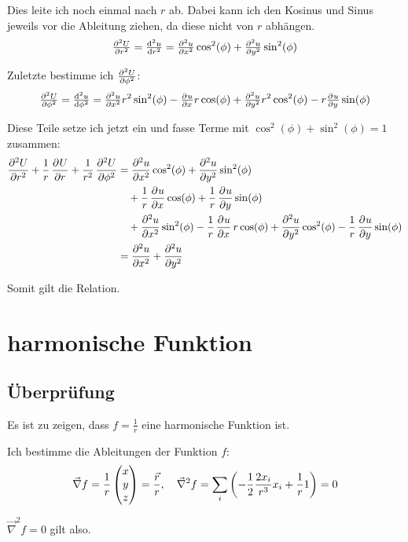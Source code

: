 \documentclass[11pt, ngerman]{article}
\newcommand{\laplace}{\vnabla^2}
\newcommand{\vnabla}{\vec \nabla}
\begin{document}
Dies leite ich noch einmal nach $r$ ab. Dabei kann ich den Kosinus und Sinus
jeweils vor die Ableitung ziehen, da diese nicht von $r$ abhängen.
\[
	\pd[2] Ur = \od[2] ur = \pd[2] ux \cos^2(\phi) + \pd[2] uy \sin^2(\phi)
\]

Zuletzte bestimme ich $\pd[2] U\phi$:
\[
	\pd[2] U\phi = \od[2] u\phi = \pd[2] ux r^2 \sin^2(\phi) - \pd ux r
	\cos(\phi) + \pd[2] uy r^2 \cos^2(\phi) - r \pd uy \sin(\phi)
\]

Diese Teile setze ich jetzt ein und fasse Terme mit $\cos^2(\phi) +
\sin^2(\phi) = 1$ zusammen:
%
\begin{align*}
	\dpd[2] Ur + \frac 1r \dpd Ur + \frac 1{r^2} \dpd[2] U\phi
	&=\dpd[2] ux \cos^2(\phi) + \dpd[2] uy \sin^2(\phi) \\
	&\quad+ \frac 1r \dpd ux \cos(\phi) + \frac 1r \dpd uy \sin(\phi) \\
	&\quad+ \dpd[2] ux \sin^2(\phi) - \frac 1r \dpd ux r \cos(\phi) + \dpd[2]
	uy \cos^2(\phi) - \frac 1r \dpd uy \sin(\phi) \\
	&= \dpd[2] ux + \dpd[2] uy
\end{align*}

Somit gilt die Relation.

\section{harmonische Funktion}

\subsection{Überprüfung}

Es ist zu zeigen, dass $f = \frac 1r$ eine harmonische Funktion ist.

Ich bestimme die Ableitungen der Funktion $f$:
\[
	\vnabla f = \frac{1}{r} \begin{pmatrix}
		x \\ y \\ z
	\end{pmatrix} = \frac{\vec r}{r}
	,\quad
	\laplace f = \sum_i \del{- \frac12 \frac{2x_i}{r^3} x_i + \frac 1r 1} = 0
\]

$\laplace f = 0$ gilt also.
\end{document}
